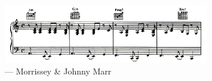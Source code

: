 \cleardoublepage
\thispagestyle{empty}


\vspace*{3cm}

\begin{figure}[h!] 
\raggedleft
\includegraphics[width=0.8\textwidth]{../head/oscillate_wildly.png} \\
	--- Morrissey \& Johnny Marr
\end{figure}

%

%


